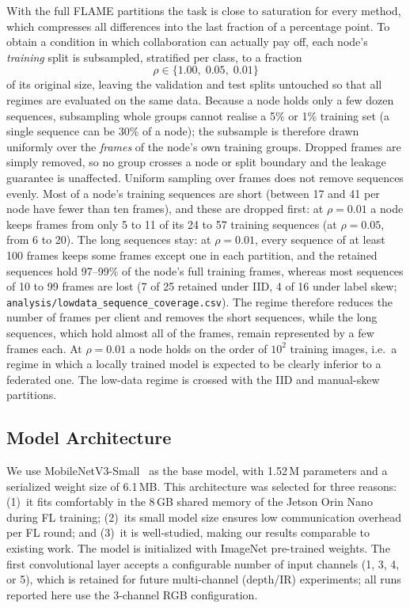 \documentclass[journal]{IEEEtran}
\begin{document}
With the full FLAME partitions the task is close to saturation for every method, which compresses all differences into the last fraction of a percentage point. To obtain a condition in which collaboration can actually pay off, each node's \emph{training} split is subsampled, stratified per class, to a fraction
\begin{equation}
\rho \in \{1.00,\; 0.05,\; 0.01\}
\label{eq:subsample}
\end{equation}
of its original size, leaving the validation and test splits untouched so that all regimes are evaluated on the same data. Because a node holds only a few dozen sequences, subsampling whole groups cannot realise a 5\% or 1\% training set (a single sequence can be 30\% of a node); the subsample is therefore drawn uniformly over the \emph{frames} of the node's own training groups. Dropped frames are simply removed, so no group crosses a node or split boundary and the leakage guarantee is unaffected. Uniform sampling over frames does not remove sequences evenly. Most of a node's training sequences are short (between 17 and 41 per node have fewer than ten frames), and these are dropped first: at $\rho = 0.01$ a node keeps frames from only 5 to 11 of its 24 to 57 training sequences (at $\rho = 0.05$, from 6 to 20). The long sequences stay: at $\rho = 0.01$, every sequence of at least 100 frames keeps some frames except one in each partition, and the retained sequences hold 97--99\% of the node's full training frames, whereas most sequences of 10 to 99 frames are lost (7 of 25 retained under IID, 4 of 16 under label skew; \texttt{analysis/lowdata\_sequence\_coverage.csv}). The regime therefore reduces the number of frames per client and removes the short sequences, while the long sequences, which hold almost all of the frames, remain represented by a few frames each. At $\rho = 0.01$ a node holds on the order of $10^2$ training images, i.e.\ a regime in which a locally trained model is expected to be clearly inferior to a federated one. The low-data regime is crossed with the IID and manual-skew partitions.

\subsection{Model Architecture}

We use MobileNetV3-Small~\cite{howard2019mobilenetv3} as the base model, with 1.52\,M parameters and a serialized weight size of 6.1\,MB. This architecture was selected for three reasons: (1)~it fits comfortably in the 8\,GB shared memory of the Jetson Orin Nano during FL training; (2)~its small model size ensures low communication overhead per FL round; and (3)~it is well-studied, making our results comparable to existing work. The model is initialized with ImageNet pre-trained weights. The first convolutional layer accepts a configurable number of input channels (1, 3, 4, or 5), which is retained for future multi-channel (depth/IR) experiments; all runs reported here use the 3-channel RGB configuration.
\end{document}
